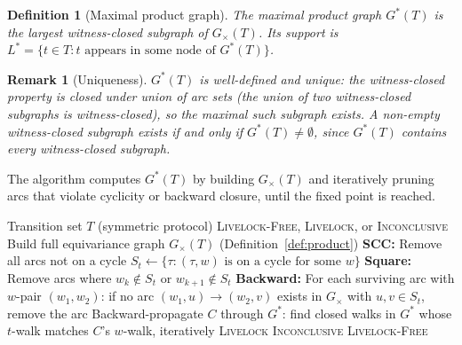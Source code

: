 \documentclass[11pt]{article}
\newtheorem{definition}{Definition}
\newtheorem{remark}{Remark}
\begin{document}
\begin{definition}[Maximal product graph]
\label{def:maximal-product}
The \emph{maximal product graph} $G^*(T)$ is the largest witness-closed subgraph of $G_\times(T)$. Its \emph{support} is $L^* = \{t \in T : t \text{ appears in some node of } G^*(T)\}$.
\end{definition}

\begin{remark}[Uniqueness]
$G^*(T)$ is well-defined and unique: the witness-closed property is closed under union of arc sets (the union of two witness-closed subgraphs is witness-closed), so the maximal such subgraph exists. A non-empty witness-closed subgraph exists if and only if $G^*(T) \neq \emptyset$, since $G^*(T)$ contains every witness-closed subgraph.
\end{remark}

The algorithm computes $G^*(T)$ by building $G_\times(T)$ and iteratively pruning arcs that violate cyclicity or backward closure, until the fixed point is reached.

\begin{algorithm}[ht]
\caption{Computing the Maximal Product Graph $G^*(T)$}
\label{alg:main}
\begin{algorithmic}[1]
\Require Transition set $T$ (symmetric protocol)
\Ensure \textsc{Livelock-Free}, \textsc{Livelock}, or \textsc{Inconclusive}
\State Build full equivariance graph $G_\times(T)$ (Definition~\ref{def:product})
\Repeat
    \State \textbf{SCC:} Remove all arcs not on a cycle 
    \State $S_t \gets \{\tau : (\tau, w) \text{ is on a cycle for some } w\}$ 
    \State \textbf{Square:} Remove arcs where $w_k \notin S_t$ or $w_{k+1} \notin S_t$
    \State \textbf{Backward:} For each surviving arc with $w$-pair $(w_1, w_2)$:
    \Statex \hspace{3.5em} if no arc $(w_1, u) \to (w_2, v)$ exists in $G_\times$ with $u, v \in S_t$, remove the arc
    \Statex \hspace{3.5em} 
        \State Backward-propagate $C$ through $G^*$: find closed walks in $G^*$
        \Statex \hspace{3.5em} whose $t$-walk matches $C$'s $w$-walk, iteratively
            \State \Return \textsc{Livelock}
        \EndIf
    \EndFor
    \State \Return \textsc{Inconclusive} 
\Else
    \State \Return \textsc{Livelock-Free} 
\EndIf
\end{algorithmic}
\end{algorithm}
\end{document}
